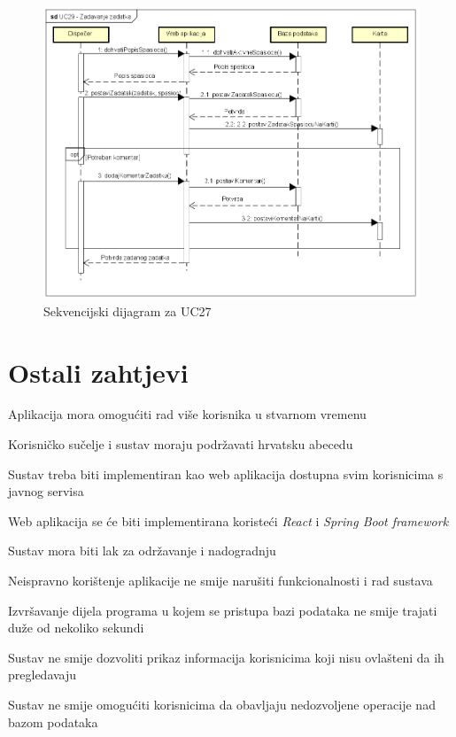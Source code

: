 \begin{packed_item}
\begin{packed_item}
					\begin{figure}[h!]
						\centering
						\includegraphics[width=\textwidth]{./slike/UC27.png}
						\caption{Sekvencijski dijagram za UC27}
						
					\end{figure}
					\eject
					
				\end{packed_item}
				\eject
			\end{packed_item}
			\newpage

	
		\section{Ostali zahtjevi\\}
		
		\begin{packed_item}
			
			\item Aplikacija mora omogućiti rad više korisnika u stvarnom vremenu
			\item Korisničko sučelje i sustav moraju podržavati hrvatsku abecedu
			\item Sustav treba biti implementiran kao web aplikacija dostupna svim korisnicima s javnog servisa
			\item Web aplikacija se će biti implementirana koristeći \textit{React} i \textit{Spring Boot framework}
			\item Sustav mora biti lak za održavanje i nadogradnju
			\item Neispravno korištenje aplikacije ne smije narušiti funkcionalnosti i rad sustava
			\item Izvršavanje dijela programa u kojem se pristupa bazi podataka ne smije trajati duže od nekoliko sekundi
			\item Sustav ne smije dozvoliti prikaz informacija korisnicima koji nisu ovlašteni da ih pregledavaju
			\item Sustav ne smije omogućiti korisnicima da obavljaju nedozvoljene operacije nad bazom podataka
			
		\end{packed_item}
			 
			 
			 
	
